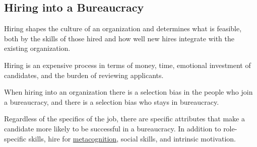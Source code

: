 \subsection{Hiring into a Bureaucracy}

Hiring shapes the culture of an organization and determines what is feasible, both by the skills of those hired and how well new hires integrate with the existing organization. 

Hiring is an expensive process in terms of money, time, emotional investment of candidates, and the burden of reviewing applicants. 

When hiring into an organization there is a selection bias in the people who join a bureaucracy, and there is a selection bias who stays in bureaucracy. 



Regardless of the specifics of the job, there are specific attributes that make a candidate more likely to be successful in a bureaucracy. In addition to role-specific skills, hire for \href{https://en.wikipedia.org/wiki/Metacognition}{metacognition}, social skills, and intrinsic motivation.




